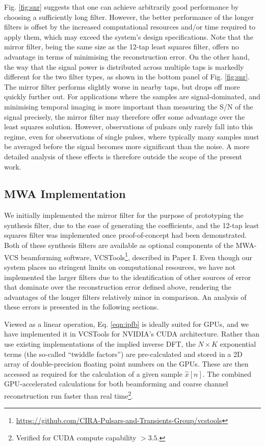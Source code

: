 \documentclass{pasa}%
\newcommand{\PaperI}{Paper I\nocite{Ord2019}}
\newcommand{\vcstools}{VCSTools}
\begin{document}
Fig. \ref{fig:snr} suggests that one can achieve arbitrarily good performance by choosing a sufficiently long filter.
However, the better performance of the longer filters is offset by the increased computational resources and/or time required to apply them, which may exceed the system's design specifications.
Note that the mirror filter, being the same size as the 12-tap least squares filter, offers no advantage in terms of minimising the reconstruction error.
On the other hand, the way that the signal power is distributed across multiple taps is markedly different for the two filter types, as shown in the bottom panel of Fig. \ref{fig:snr}.
The mirror filter performs slightly worse in nearby taps, but drops off more quickly further out.
For applications where the samples are signal-dominated, and minimising temporal imaging is more important than measuring the S/N of the signal precisely, the mirror filter may therefore offer some advantage over the least squares solution.
However, observations of pulsars only rarely fall into this regime, even for observations of single pulses, where typically many samples must be averaged before the signal becomes more significant than the noise.
A more detailed analysis of these effects is therefore outside the scope of the present work.

\subsection{MWA Implementation}

We initially implemented the mirror filter for the purpose of prototyping the synthesis filter, due to the ease of generating the coefficients, and the 12-tap least squares filter was implemented once proof-of-concept had been demonstrated.
Both of these synthesis filters are available as optional components of the MWA-VCS beamforming software, \vcstools{}\footnote{\url{https://github.com/CIRA-Pulsars-and-Transients-Group/vcstools}}, described in \PaperI{}.
Even though our system places no stringent limits on computational resources, we have not implemented the larger filters due to the identification of other sources of error that dominate over the reconstruction error defined above, rendering the advantages of the longer filters relatively minor in comparison.
An analysis of these errors is presented in the following sections.

Viewed as a linear operation, Eq. \eqref{eqn:ipfb} is ideally suited for GPUs, and we have implemented it in \vcstools{} for NVIDIA's CUDA architecture.
Rather than use existing implementations of the implied inverse DFT, the $N \times K$ exponential terms (the so-called ``twiddle factors'') are pre-calculated and stored in a 2D array of double-precision floating point numbers on the GPUs.
These are then accessed as required for the calculation of a given sample $\hat{x}[n]$.
The combined GPU-accelerated calculations for both beamforming and coarse channel reconstruction run faster than real time\footnote{Verified for CUDA compute capability $>3.5$.}.
\end{document}
